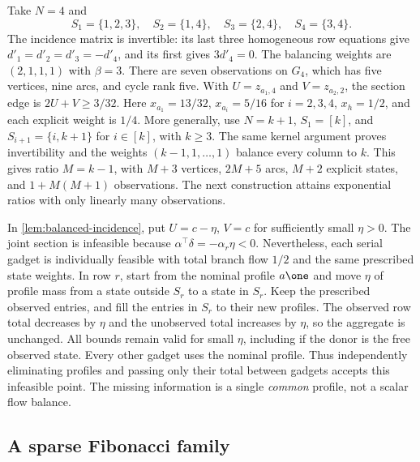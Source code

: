 \begin{example}\label{ex:small-sp}
Take $N=4$ and
\[
 S_1=\{1,2,3\},\quad S_2=\{1,4\},\quad
 S_3=\{2,4\},\quad S_4=\{3,4\}.
\]
The incidence matrix is invertible: its last three homogeneous row
equations give $d'_1=d'_2=d'_3=-d'_4$, and its first gives
$3d'_4=0$. The balancing weights are $(2,1,1,1)$ with $\beta=3$.
There are seven observations on $G_4$, which has five vertices,
nine arcs, and cycle rank five. With $U=z_{a_1,4}$ and
$V=z_{a_2,2}$, the section edge is $2U+V\ge3/32$.
Here $x_{a_1}=13/32$, $x_{a_i}=5/16$ for $i=2,3,4$,
$x_h=1/2$, and each explicit weight is $1/4$.
More generally, use $N=k+1$, $S_1=[k]$, and
$S_{i+1}=\{i,k+1\}$ for $i\in[k]$, with $k\ge3$.
The same kernel argument proves invertibility and the weights
$(k-1,1,\ldots,1)$ balance every column to $k$. This gives ratio
$M=k-1$, with $M+3$ vertices, $2M+5$ arcs, $M+2$ explicit
states, and $1+M(M+1)$ observations. The next construction attains
exponential ratios with only linearly many observations.
\end{example}

\begin{remark}\label{rem:scalar-failure}
In \cref{lem:balanced-incidence}, put $U=c-\eta$, $V=c$ for
sufficiently small $\eta>0$. The joint section is infeasible because
$\alpha^\top\delta=-\alpha_r\eta<0$. Nevertheless, each serial
gadget is individually feasible with total branch flow $1/2$ and
the same prescribed state weights. In row $r$, start from the nominal
profile $a\one$ and move $\eta$ of profile mass from a state outside
$S_r$ to a state in $S_r$. Keep the prescribed observed entries,
and fill the entries in $S_r$ to their new profiles. The observed
row total decreases by $\eta$ and the unobserved total increases
by $\eta$, so the aggregate is unchanged. All bounds remain valid
for small $\eta$, including if the donor is the free observed state.
Every other gadget uses the nominal profile. Thus independently
eliminating profiles and passing only their total between gadgets
accepts this infeasible point. The missing information is a single
\emph{common} profile, not a scalar flow balance.
\end{remark}

\subsection{A sparse Fibonacci family}

